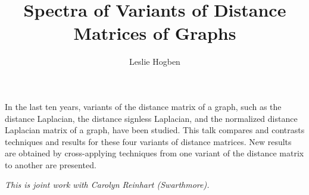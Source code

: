 \documentclass[a4paper]{amsart}
\date{}
\begin{document}
\title{Spectra of Variants of Distance Matrices of Graphs}
\author{Leslie Hogben} %
\address{Iowa State University and American Institute of Mathematics} %

\maketitle


In the last ten years, variants of the distance matrix of a graph, such as the distance Laplacian, the distance signless Laplacian, and the normalized distance Laplacian matrix of a graph, have been studied. This talk compares and contrasts techniques and results for these four variants of distance matrices.  New results are obtained by cross-applying techniques from one variant of the distance matrix to another are presented.

\emph{This is joint work with Carolyn Reinhart (Swarthmore).}
\end{document}
